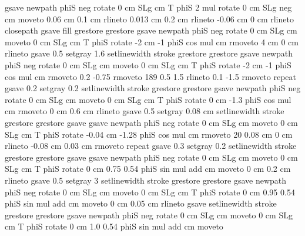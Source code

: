 {{gsave
     newpath
     phiS neg rotate
       0 cm SLg cm T
        phiS 2 mul rotate
         0 cm SLg  neg cm moveto
         0.06 cm 0.1 cm rlineto
         0.013 cm 0.2 cm rlineto
        -0.06 cm 0 cm rlineto
       closepath
     gsave
       \pst@usecolor\PoCMineCol
         fill
    grestore
grestore
gsave
     newpath
        phiS neg rotate
        0 cm SLg cm moveto
        0 cm SLg cm T
        phiS rotate
        -2 cm -1 phiS cos mul cm rmoveto
        4 cm 0 cm rlineto
    gsave
         0.5 setgray
                1.6 setlinewidth
         stroke
    grestore
grestore
gsave
     newpath
        phiS neg rotate
        0 cm SLg cm moveto
        0 cm SLg cm T
        phiS rotate
        -2 cm -1 phiS cos mul cm rmoveto
        0.2 -0.75 rmoveto
       189 { 0.5 1.5 rlineto
        0.1 -1.5 rmoveto } repeat
    gsave
         0.2 setgray
                0.2 setlinewidth
         stroke
    grestore
grestore
gsave
     newpath
        phiS neg rotate
        0 cm SLg cm moveto
        0 cm SLg cm T
        phiS rotate
        0 cm -1.3 phiS cos mul cm rmoveto
        0 cm 0.6 cm rlineto
    gsave
         0.5 setgray
                0.08 cm setlinewidth
         stroke
    grestore
grestore
gsave
gsave
     newpath
        phiS neg rotate
        0 cm SLg cm moveto
        0 cm SLg cm T
        phiS rotate
        -0.04 cm -1.28 phiS cos mul cm rmoveto
        20 { 0.08 cm 0 cm rlineto
        -0.08 cm 0.03 cm rmoveto } repeat
    gsave
         0.3 setgray
                0.2 setlinewidth
         stroke
    grestore
grestore
gsave
gsave
     newpath
        phiS neg rotate
        0 cm SLg cm moveto
        0 cm SLg cm T
        phiS rotate
        0 cm 0.75 0.54 phiS sin mul add cm moveto
        0 cm 0.2 cm rlineto
    gsave
         0.5 setgray
                3 setlinewidth
         stroke
    grestore
grestore
gsave
     newpath
        phiS neg rotate
        0 cm SLg cm moveto
        0 cm SLg cm T
        phiS rotate
        0 cm 0.95 0.54 phiS sin mul add cm moveto
        0 cm 0.05 cm rlineto
    gsave
         \pst@usecolor{} setlinewidth
         stroke
    grestore
grestore
gsave
     newpath
        phiS neg rotate
        0 cm SLg cm moveto
        0 cm SLg cm T
        phiS rotate
        0 cm 1.0 0.54 phiS sin mul add cm moveto
}}
